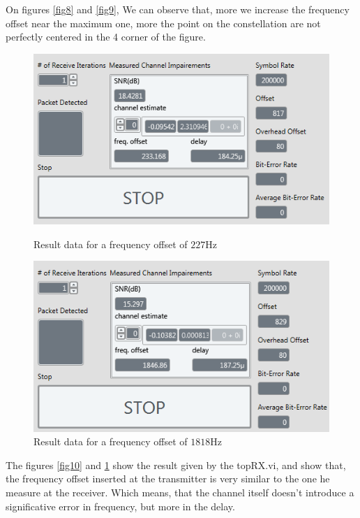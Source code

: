 \documentclass[frenchb, oneside, headings=normal]{scrartcl}
\begin{document}
On figures \ref{fig8} and \ref{fig9}, We can observe that, more we increase the frequency offset near the maximum one, more the point on the constellation are not perfectly centered in the 4 corner of the figure.

\begin{figure}[!ht]
    \begin{minipage}[b]{0.48\linewidth}
        \centering \includegraphics[scale=0.7]{img/USRP_value_227.PNG}
     \caption{Result data for a frequency offset of $227 \si{\hertz}$}
     \label{fig10}
    \end{minipage}\hfill
    \begin{minipage}[b]{0.48\linewidth}
         \centering \includegraphics[scale=0.7]{img/USRP_value_1818.PNG}
          \caption{Result data for a frequency offset of $1818 \si{\hertz}$}
          \label{fig11}
    \end{minipage}  
\end{figure}

The figures \ref{fig10} and \ref{fig11} show the result given by the topRX.vi, and show that, the frequency offset inserted at the transmitter is very similar to the one he measure at the receiver. Which means, that the channel itself doesn't introduce a significative error in frequency, but more in the delay.
\newpage
\end{document}
